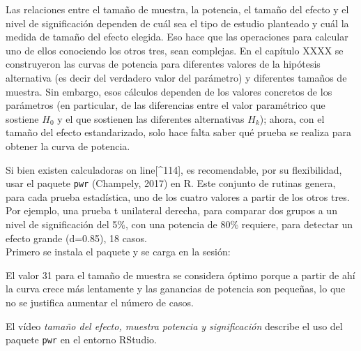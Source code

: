 \documentclass[]{book}
\begin{document}
Las relaciones entre el tamaño de muestra, la potencia, el tamaño del
efecto y el nivel de significación dependen de cuál sea el tipo de
estudio planteado y cuál la medida de tamaño del efecto elegida. Eso
hace que las operaciones para calcular uno de ellos conociendo los otros
tres, sean complejas. En el capítulo XXXX se construyeron las curvas de
potencia para diferentes valores de la hipótesis alternativa (es decir
del verdadero valor del parámetro) y diferentes tamaños de muestra. Sin
embargo, esos cálculos dependen de los valores concretos de los
parámetros (en particular, de las diferencias entre el valor paramétrico
que sostiene \(H_0\) y el que sostienen las diferentes alternativas \(H_k\));
ahora, con el tamaño del efecto estandarizado, solo hace falta saber qué
prueba se realiza para obtener la curva de potencia.

Si bien existen calculadoras on line{[}\^{}114{]}, es recomendable, por su
flexibilidad, usar el paquete \texttt{pwr} (Champely, 2017) en R. Este conjunto
de rutinas genera, para cada prueba estadística, uno de los cuatro
valores a partir de los otros tres. Por ejemplo, una prueba t unilateral
derecha, para comparar dos grupos a un nivel de significación del 5\%,
con una potencia de 80\% requiere, para detectar un efecto grande
(d=0.85), 18 casos.\\
Primero se instala el paquete y se carga en la sesión:

El valor 31 para el tamaño de muestra se considera óptimo porque a
partir de ahí la curva crece más lentamente y las ganancias de potencia
son pequeñas, lo que no se justifica aumentar el número de casos.

El vídeo \emph{tamaño del efecto, muestra potencia y significación} describe
el uso del paquete \texttt{pwr} en el entorno RStudio.


\end{document}
